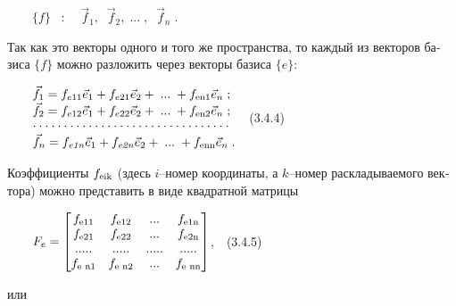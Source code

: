 \documentclass[a4paper]{article}
\newcommand\boldsubformula[1]{\text{\mathversion{bold}$#1$}}
\newcommand\normalsubformula[1]{\text{\mathversion{normal}$#1$}}
\begin{document}
{\begin{russian}\sffamily
\ \ \ \  $\{f\}\;\;\;:\;\;\;\;\vec f_1,\;\;\vec f_2,\;...\;,\;\;\vec f_n\;$.
\end{russian}}

{\begin{russian}\sffamily
Так как это векторы одного и того же пространства, то каждый из векторов базиса  $\{f\}$\textit{ }можно разложить через
векторы базиса  $\{e\}$:
\end{russian}}

{\begin{russian}\sffamily
\ \ \ \  $\begin{matrix}\vec f_1=f_{e11}\vec e_1+f_{e21}\vec e_2+\;...\;+f_{\normalsubformula{\text{en}}1}\vec
e_n\;;\hfill\null \\\vec f_2=f_{e12}\vec e_1+f_{e22}\vec e_2+\;...\;+f_{\normalsubformula{\text{en}}2}\vec
e_n\;;\hfill\null \\\cdot \cdot \cdot \cdot \cdot \cdot \cdot \cdot \cdot \cdot \cdot \cdot \cdot \cdot \cdot \cdot
\cdot \cdot \cdot \cdot \cdot \cdot \cdot \cdot \cdot \cdot \cdot \cdot \cdot \cdot \cdot \cdot \hfill\null \\\vec
f_n=f_{\mathit{e1n}}\vec e_1+f_{\mathit{e2n}}\vec e_2+\;...\;+f_{\normalsubformula{\text{enn}}}\vec e_n\;.\hfill\null
\end{matrix}\hfill $\ \ (3.4.4)
\end{russian}}

{\begin{russian}\sffamily
Коэффициенты  $f_{\normalsubformula{\text{eik}}}$ (здесь  $i$–номер координаты, а  $k$–номер раскладываемого вектора)
можно представить в виде квадратной матрицы
\end{russian}}

{\begin{russian}\sffamily
\ \ \ \ 
$F_e=\left[\begin{matrix}f_{\boldsubformula{\text{e11}}}&f_{\boldsubformula{\text{e12}}}&...&f_{\boldsubformula{\text{e1n}}}\\f_{\boldsubformula{\text{e21}}}&f_{\boldsubformula{\text{e22}}}&...&f_{\boldsubformula{\text{e2n}}}\\.....&.....&.....&.....\\f_{\boldsubformula{\text{e
n1}}}&f_{\boldsubformula{\text{e n2}}}&...&f_{\boldsubformula{\text{e nn}}}\end{matrix}\right]$,\ \ (3.4.5)
\end{russian}}

{\begin{russian}\sffamily
или 
\end{russian}}
\end{document}
